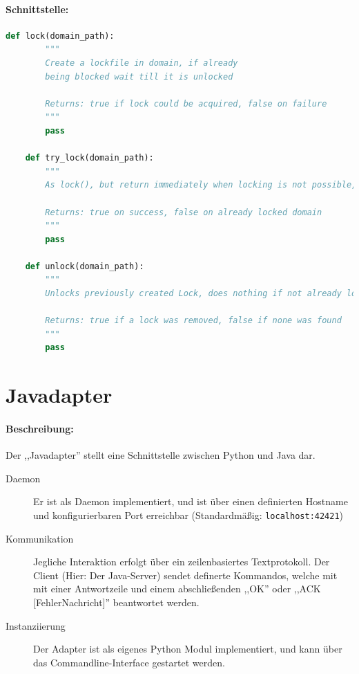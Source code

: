 \paragraph{Schnittstelle:}
\label{par:schnittstelle_}
\hfill
\begin{lstlisting}[language=python]
    def lock(domain_path):
        """
        Create a lockfile in domain, if already
        being blocked wait till it is unlocked

        Returns: true if lock could be acquired, false on failure
        """
        pass

    def try_lock(domain_path):
        """
        As lock(), but return immediately when locking is not possible,

        Returns: true on success, false on already locked domain
        """
        pass

    def unlock(domain_path):
        """
        Unlocks previously created Lock, does nothing if not already locked.

        Returns: true if a lock was removed, false if none was found
        """
        pass
\end{lstlisting}



\section{Javadapter} 
\label{sec:javadapter}
\paragraph{Beschreibung:}
\label{par:beschreibung_}
Der ,,Javadapter'' stellt eine Schnittstelle zwischen Python und Java dar.
\begin{description}
  \item [Daemon] Er ist als Daemon implementiert, und ist über einen
    definierten Hostname und konfigurierbaren Port erreichbar 
    (Standardmäßig: \texttt{localhost:42421})
  \item [Kommunikation] Jegliche Interaktion erfolgt über ein
    zeilenbasiertes Textprotokoll. Der Client (Hier: Der Java-Server)
    sendet definerte Kommandos, welche mit mit einer Antwortzeile
    und einem abschließenden ,,OK'' oder ,,ACK [FehlerNachricht]''
    beantwortet werden.
  \item [Instanziierung] Der Adapter ist als eigenes Python Modul
    implementiert, und kann über das Commandline-Interface gestartet
    werden.
\end{description}
 
